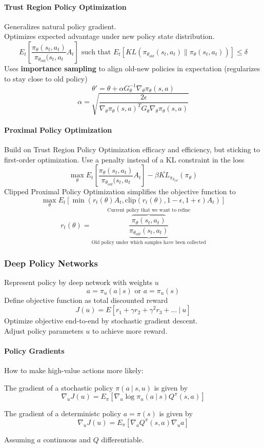 \documentclass[10pt]{report}
\begin{document}
\paragraph{Trust Region Policy Optimization} Generalizes natural policy gradient.\\
Optimizes expected advantage under new policy state distribution.
$$E_t\left[\frac{\pi_\theta(s_t,a_t)}{\pi_{\theta_{old}}(s_t,a_t}A_t\right]\text{ such that }E_t\left[KL\left(\pi_{\theta_{old}}(s_t,a_t)\|\pi_\theta(s_t,a_t)\right)\right]\leq \delta$$
Uses \textbf{importance sampling} to align old-new policies in expectation (regularizes to stay close to old policy)
$$\theta'=\theta+\alpha G_\theta^{-1}\nabla_\theta\pi_\theta(s,a)$$
$$\alpha=\sqrt{\frac{2\epsilon}{\nabla_\theta\pi_\theta(s,a)^TG_\theta\nabla_\theta\pi_\theta(s,a)}}$$
\paragraph{Proximal Policy Optimization} Build on Trust Region Policy Optimization efficacy and efficiency, but sticking to first-order optimization. Use a penalty instead of a KL constraint in the loss
$$\max_\theta E_t\left[\frac{\pi_\theta(s_t,a_t)}{\pi_{\theta_{old}}(s_t,a_t}A_t\right]-\beta\overline{KL}_{\pi_{\theta_{old}}}(\pi_\theta)$$
Clipped Proximal Policy Optimization simplifies the objective function to
$$\max_\theta E_t[\min(r_t(\theta)A_t, \text{clip}(r_t(\theta),1-\epsilon,1+\epsilon)A_t)]$$
$$r_t(\theta)=\underset{\text{Old policy under which samples have been collected}}{\overset{\text{Current policy that we want to refine}}{\frac{\overbrace{\pi_\theta(s_t,a_t)}}{\underbrace{\pi_{\theta_{old}}(s_t,a_t)}}}}$$
\subsubsection{Deep Policy Networks}
Represent policy by deep network with weights $u$
$$a=\pi_u(a\:|\:s)\text{ or } a=\pi_u(s)$$
Define objective function as total discounted reward
$$J(u) = E[r_1+\gamma r_2+\gamma^2r_3+\ldots\:|\:u]$$
Optimize objective end-to-end by stochastic gradient descent.\\
Adjust policy parameters $u$ to achieve more reward.
\paragraph{Policy Gradients} How to make high-value actions more likely:
\begin{list}{}{}
	\item The gradient of a stochastic policy $\pi(a\:|\:s,u)$ is given by $$\nabla_u J(u) = E_\pi[\nabla_u\log\pi_u(a\:|\:s)Q^\pi(s,a)]$$
	\item The gradient of a deterministc policy $a=\pi(s)$ is given by
	$$\nabla_u J(u) = E_\pi[\nabla_aQ^\pi(s,a)\nabla_u a]$$
\end{list}
Assuming $a$ continuous and $Q$ differentiable.
\end{document}
